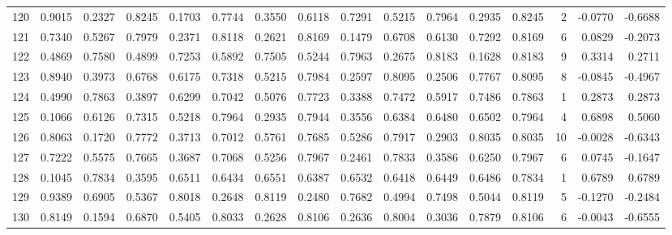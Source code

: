 \begin{tabular}{lrrrrrrrrrrrrrrr}
120 &      0.9015 &  0.2327 &  0.8245 &  0.1703 &  0.7744 &  0.3550 &  0.6118 &  0.7291 &  0.5215 &  0.7964 &   0.2935 &     0.8245 &      2 &                   -0.0770 &                    -0.6688 \\
121 &      0.7340 &  0.5267 &  0.7979 &  0.2371 &  0.8118 &  0.2621 &  0.8169 &  0.1479 &  0.6708 &  0.6130 &   0.7292 &     0.8169 &      6 &                    0.0829 &                    -0.2073 \\
122 &      0.4869 &  0.7580 &  0.4899 &  0.7253 &  0.5892 &  0.7505 &  0.5244 &  0.7963 &  0.2675 &  0.8183 &   0.1628 &     0.8183 &      9 &                    0.3314 &                     0.2711 \\
123 &      0.8940 &  0.3973 &  0.6768 &  0.6175 &  0.7318 &  0.5215 &  0.7984 &  0.2597 &  0.8095 &  0.2506 &   0.7767 &     0.8095 &      8 &                   -0.0845 &                    -0.4967 \\
124 &      0.4990 &  0.7863 &  0.3897 &  0.6299 &  0.7042 &  0.5076 &  0.7723 &  0.3388 &  0.7472 &  0.5917 &   0.7486 &     0.7863 &      1 &                    0.2873 &                     0.2873 \\
125 &      0.1066 &  0.6126 &  0.7315 &  0.5218 &  0.7964 &  0.2935 &  0.7944 &  0.3556 &  0.6384 &  0.6480 &   0.6502 &     0.7964 &      4 &                    0.6898 &                     0.5060 \\
126 &      0.8063 &  0.1720 &  0.7772 &  0.3713 &  0.7012 &  0.5761 &  0.7685 &  0.5286 &  0.7917 &  0.2903 &   0.8035 &     0.8035 &     10 &                   -0.0028 &                    -0.6343 \\
127 &      0.7222 &  0.5575 &  0.7665 &  0.3687 &  0.7068 &  0.5256 &  0.7967 &  0.2461 &  0.7833 &  0.3586 &   0.6250 &     0.7967 &      6 &                    0.0745 &                    -0.1647 \\
128 &      0.1045 &  0.7834 &  0.3595 &  0.6511 &  0.6434 &  0.6551 &  0.6387 &  0.6532 &  0.6418 &  0.6449 &   0.6486 &     0.7834 &      1 &                    0.6789 &                     0.6789 \\
129 &      0.9389 &  0.6905 &  0.5367 &  0.8018 &  0.2648 &  0.8119 &  0.2480 &  0.7682 &  0.4994 &  0.7498 &   0.5044 &     0.8119 &      5 &                   -0.1270 &                    -0.2484 \\
130 &      0.8149 &  0.1594 &  0.6870 &  0.5405 &  0.8033 &  0.2628 &  0.8106 &  0.2636 &  0.8004 &  0.3036 &   0.7879 &     0.8106 &      6 &                   -0.0043 &                    -0.6555 \\

\end{tabular}
